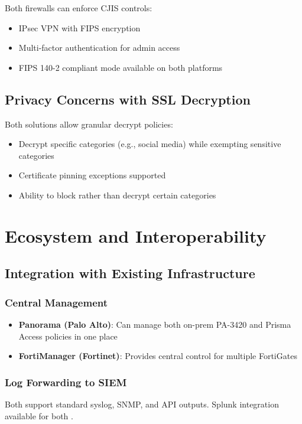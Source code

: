 \documentclass[12pt]{article}
\begin{document}
Both firewalls can enforce CJIS controls:
\begin{itemize}
    \item IPsec VPN with FIPS encryption
    \item Multi-factor authentication for admin access
    \item FIPS 140-2 compliant mode available on both platforms
\end{itemize}

\subsection{Privacy Concerns with SSL Decryption}

Both solutions allow granular decrypt policies:
\begin{itemize}
    \item Decrypt specific categories (e.g., social media) while exempting sensitive categories
    \item Certificate pinning exceptions supported
    \item Ability to block rather than decrypt certain categories
\end{itemize}

\section{Ecosystem and Interoperability}

\subsection{Integration with Existing Infrastructure}

\subsubsection{Central Management}
\begin{itemize}
    \item \textbf{Panorama (Palo Alto)}: Can manage both on-prem PA-3420 and Prisma Access policies in one place
    \item \textbf{FortiManager (Fortinet)}: Provides central control for multiple FortiGates
\end{itemize}

\subsubsection{Log Forwarding to SIEM}
Both support standard syslog, SNMP, and API outputs. Splunk integration available for both \cite{splunkpaloalto}.
\end{document}
